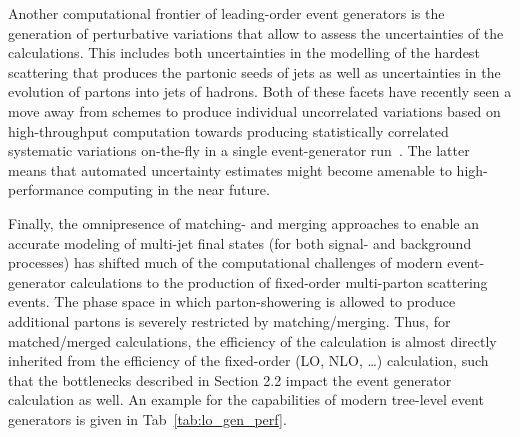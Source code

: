\documentclass{article}
\begin{document}
Another computational frontier of leading-order event generators is the 
generation of perturbative variations that allow to assess the uncertainties
of the calculations. This includes both uncertainties in the modelling of
the hardest scattering that produces the partonic seeds of jets as well as
uncertainties in the evolution of partons into jets of hadrons. Both of these
facets have recently seen a move away from schemes to produce individual
uncorrelated variations based on high-throughput computation towards producing
statistically correlated systematic variations on-the-fly in a single 
event-generator run~\cite{Bellm:2016rhh,Mrenna:2016sih,Bothmann:2016nao}. The 
latter means that automated uncertainty estimates might
become amenable to high-performance computing in the near future.

Finally, the omnipresence of matching- and merging approaches to 
enable an accurate modeling of multi-jet final states (for both
signal- and background processes) has shifted much of the computational
challenges of modern event-generator calculations to the production of
fixed-order multi-parton scattering events. The phase space in which 
parton-showering is allowed to produce additional partons is severely 
restricted by matching/merging. Thus, for matched/merged calculations, the 
efficiency of the calculation is almost directly inherited from the
efficiency of the fixed-order (LO, NLO, \dots) calculation,
such that the bottlenecks 
described in Section 2.2 impact the event generator calculation as well.
An example for the capabilities of modern tree-level event generators
is given in Tab~\ref{tab:lo_gen_perf}.
\end{document}
